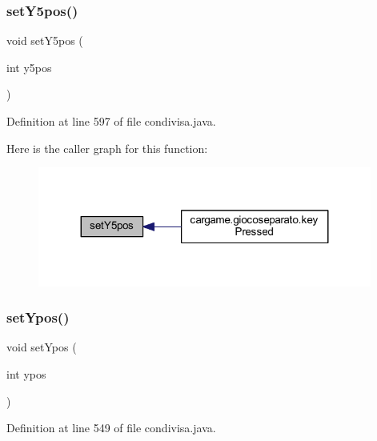 \subsubsection{\texorpdfstring{set\+Y5pos()}{setY5pos()}}
{\footnotesize\ttfamily void set\+Y5pos (\begin{DoxyParamCaption}\item[{int}]{y5pos }\end{DoxyParamCaption})}



Definition at line 597 of file condivisa.\+java.

Here is the caller graph for this function\+:
\nopagebreak
\begin{figure}[H]
\begin{center}
\leavevmode
\includegraphics[width=311pt]{classcargame_1_1condivisa_a3c187905ecd13a93abdacba7bf7b3176_icgraph}
\end{center}
\end{figure}
\mbox{\label{classcargame_1_1condivisa_aeb77b8817744feab241516cbf8a559b7}} 
\subsubsection{\texorpdfstring{set\+Ypos()}{setYpos()}}
{\footnotesize\ttfamily void set\+Ypos (\begin{DoxyParamCaption}\item[{int}]{ypos }\end{DoxyParamCaption})}



Definition at line 549 of file condivisa.\+java.

